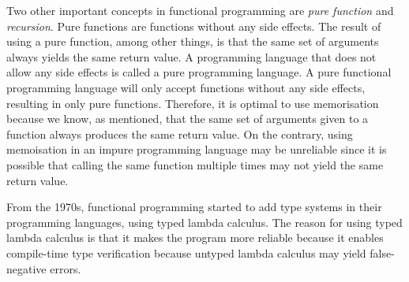 \para
Two other important concepts in functional programming are \emph{pure function} and \emph{recursion}. Pure functions are functions without any side effects. The result of using a pure function, among other things, is that the same set of arguments always yields the same return value. A programming language that does not allow any side effects is called a pure programming language. A pure functional programming language will only accept functions without any side effects, resulting in only pure functions. Therefore, it is optimal to use memorisation because we know, as mentioned, that the same set of arguments given to a function always produces the same return value. On the contrary, using memoisation in an impure programming language may be unreliable since it is possible that calling the same function multiple times may not yield the same return value. 

\para
From the 1970s, functional programming started to add type systems in their programming languages, using typed lambda calculus. The reason for using typed lambda calculus is that it makes the program more reliable because it enables compile-time type verification because untyped lambda calculus may yield false-negative errors. 
